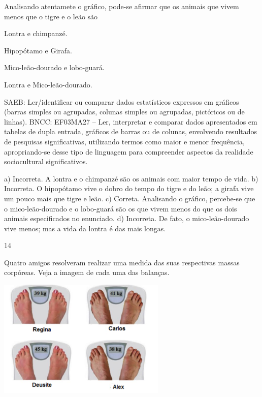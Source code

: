 {\begin{escolha}
{Analisando atentamete o gráfico, pode-se afirmar que os animais que vivem menos que o tigre e o leão são

\begin{escolha}

\item
  Lontra e chimpanzé.
\item
  Hipopótamo e Girafa.
\item
  Mico-leão-dourado e lobo-guará.
\item
  Lontra e Mico-leão-dourado.
\end{escolha}

SAEB: Ler/identificar ou comparar dados estatísticos
expressos em gráficos (barras simples ou agrupadas, colunas simples ou agrupadas, pictóricos ou de linhas).
BNCC: EF03MA27 -- Ler, interpretar e comparar dados apresentados em tabelas de dupla entrada,
gráficos de barras ou de colunas, envolvendo resultados de pesquisas significativas, utilizando
termos como maior e menor frequência, apropriando-se desse tipo de linguagem para
compreender aspectos da realidade sociocultural significativos.

a) Incorreta. A lontra e o chimpanzé são os animais com maior tempo de vida.
b) Incorreta. O hipopótamo vive o dobro do tempo do tigre e do leão; a girafa vive um pouco mais que tigre e leão.
c) Correta. Analisando o gráfico, percebe-se que o mico-leão-dourado e o lobo-guará são os que vivem menos do que os dois animais especificados no enunciado.
d) Incorreta. De fato, o mico-leão-dourado vive menos; mas a vida da lontra é das mais longas.

\num{14}

Quatro amigos resolveram realizar uma medida das suas respectivas massas corpóreas. Veja a imagem de cada uma das balanças.


\includegraphics[width=3.15196in,height=2.22201in]{media/image128.png}

}
\end{escolha}}

